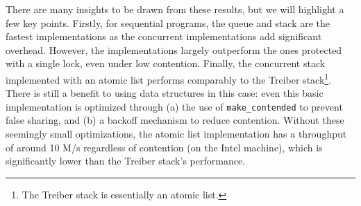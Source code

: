 \documentclass[a4paper, 11pt]{article}
\begin{document}
There are many insights to be drawn from these results, but we will highlight a few key points. Firstly, for sequential programs, the \Stdlib queue and stack are the fastest implementations as the concurrent implementations add significant overhead. However, the \Saturn implementations largely outperform the \Stdlib ones protected with a single lock, even under low contention. Finally, the concurrent stack implemented with an atomic list performs comparably to the Treiber stack\footnote[2]{The Treiber stack is essentially an atomic list.}.
There is still a benefit to using \Saturn data structures in this case: even this basic implementation is optimized through
(a) the use of \texttt{make\_contended} to prevent false sharing, and
(b) a backoff mechanism to reduce contention.
Without these seemingly small optimizations, the atomic list implementation has a throughput of around 10 M/s regardless of contention (on the Intel machine), which is significantly lower than the Treiber stack's performance.
\end{document}
